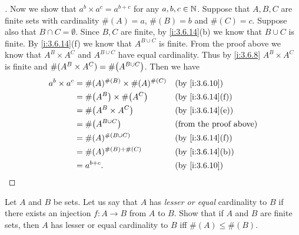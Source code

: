 \begin{proof}[]
  Now we show that \(a^b \times a^c = a^{b + c}\) for any \(a, b, c \in \mathbb{N}\).
  Suppose that \(A, B, C\) are finite sets with cardinality \(\#(A) = a\), \(\#(B) = b\) and \(\#(C) = c\).
  Suppose also that \(B \cap C = \emptyset\).
  Since \(B, C\) are finite, by \cref{i:3.6.14}(b) we know that \(B \cup C\) is finite.
  By \cref{i:3.6.14}(f) we know that \(A^{B \cup C}\) is finite.
  From the proof above we know that \(A^B \times A^C\) and \(A^{B \cup C}\) have equal cardinality.
  Thus by \cref{i:3.6.8} \(A^B \times A^C\) is finite and \(\#(A^B \times A^C) = \#\pa{A^{B \cup C}}\).
  Then we have
  \begin{align*}
    a^b \times a^c & = \#(A)^{\#(B)} \times \#(A)^{\#(C)} &  & \by{i:3.6.10}                 \\
                   & = \#\pa{A^B} \times \#\pa{A^C}       &  & \by{i:3.6.14}[f]              \\
                   & = \#\pa{A^B \times A^C}              &  & \by{i:3.6.14}[e]              \\
                   & = \#\pa{A^{B \cup C}}                &  & \text{(from the proof above)} \\
                   & = \#(A)^{\#(B \cup C)}               &  & \by{i:3.6.14}[f]              \\
                   & = \#(A)^{\#(B) + \#(C)}              &  & \by{i:3.6.14}[b]              \\
                   & = a^{b + c}.                         &  & \by{i:3.6.10}
  \end{align*}
\end{proof}

\begin{ex}\label{i:ex:3.6.7}
  Let \(A\) and \(B\) be sets.
  Let us say that \(A\) has \emph{lesser or equal} cardinality to \(B\) if there exists an injection \(f : A \to B\) from \(A\) to \(B\).
  Show that if \(A\) and \(B\) are finite sets, then \(A\) has lesser or equal cardinality to \(B\) iff \(\#(A) \leq \#(B)\).
\end{ex}

